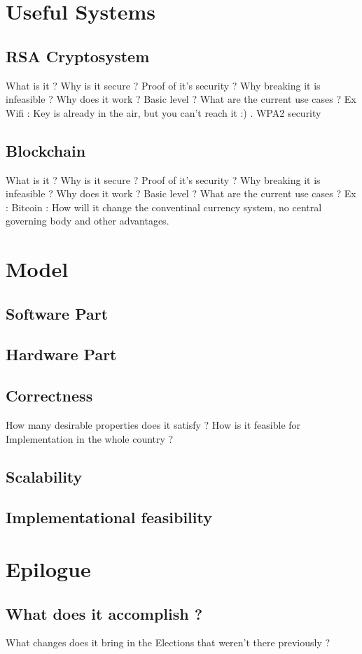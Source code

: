 \documentclass[12pt]{report}
\begin{document}
\chapter{Useful Systems}
\section{RSA Cryptosystem}
What is it ? Why is it secure ? Proof of it's security ? Why breaking it is infeasible ? Why does it work ? Basic level ? What are the current use cases ?
Ex Wifi : Key is already in the air, but you can't reach it :) . WPA2 security 
\section{Blockchain}
What is it ? Why is it secure ? Proof of it's security ? Why breaking it is infeasible ? Why does it work ? Basic level ? What are the current use cases ?
Ex : Bitcoin : How will it change the conventinal currency system, no central governing body and other advantages.


\chapter{Model}
\section{Software Part}
\section{Hardware Part}
\section{Correctness}
How many desirable properties does it satisfy ? How is it feasible for Implementation in the whole country ?
\section{Scalability}
\section{Implementational feasibility}


\chapter{Epilogue}
\section{What does it accomplish ?}
What changes does it bring in the Elections that weren't there previously ?
\end{document}
